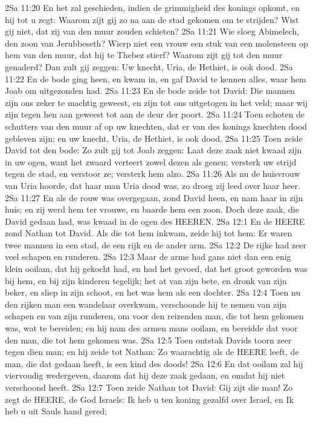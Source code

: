2Sa 11:20  En het zal geschieden, indien de grimmigheid des konings opkomt, en hij tot u zegt: Waarom zijt gij zo na aan de stad gekomen om te strijden? Wist gij niet, dat zij van den muur zouden schieten?
2Sa 11:21  Wie sloeg Abimelech, den zoon van Jerubbeseth? Wierp niet een vrouw een stuk van een molensteen op hem van den muur, dat hij te Thebez stierf? Waarom zijt gij tot den muur genaderd? Dan zult gij zeggen: Uw knecht, Uria, de Hethiet, is ook dood.
2Sa 11:22  En de bode ging heen, en kwam in, en gaf David te kennen alles, waar hem Joab om uitgezonden had.
2Sa 11:23  En de bode zeide tot David: Die mannen zijn ons zeker te machtig geweest, en zijn tot ons uitgetogen in het veld; maar wij zijn tegen hen aan geweest tot aan de deur der poort.
2Sa 11:24  Toen schoten de schutters van den muur af op uw knechten, dat er van des konings knechten dood gebleven zijn; en uw knecht, Uria, de Hethiet, is ook dood.
2Sa 11:25  Toen zeide David tot den bode: Zo zult gij tot Joab zeggen: Laat deze zaak niet kwaad zijn in uw ogen, want het zwaard verteert zowel dezen als genen; versterk uw strijd tegen de stad, en verstoor ze; versterk hem alzo.
2Sa 11:26  Als nu de huisvrouw van Uria hoorde, dat haar man Uria dood was, zo droeg zij leed over haar heer.
2Sa 11:27  En als de rouw was overgegaan, zond David heen, en nam haar in zijn huis; en zij werd hem ter vrouwe, en baarde hem een zoon. Doch deze zaak, die David gedaan had, was kwaad in de ogen des HEEREN.
2Sa 12:1  En de HEERE zond Nathan tot David. Als die tot hem inkwam, zeide hij tot hem: Er waren twee mannen in een stad, de een rijk en de ander arm.
2Sa 12:2  De rijke had zeer veel schapen en runderen.
2Sa 12:3  Maar de arme had gans niet dan een enig klein ooilam, dat hij gekocht had, en had het gevoed, dat het groot geworden was bij hem, en bij zijn kinderen tegelijk; het at van zijn bete, en dronk van zijn beker, en sliep in zijn schoot, en het was hem als een dochter.
2Sa 12:4  Toen nu den rijken man een wandelaar overkwam, verschoonde hij te nemen van zijn schapen en van zijn runderen, om voor den reizenden man, die tot hem gekomen was, wat te bereiden; en hij nam des armen mans ooilam, en bereidde dat voor den man, die tot hem gekomen was.
2Sa 12:5  Toen ontstak Davids toorn zeer tegen dien man; en hij zeide tot Nathan: Zo waarachtig als de HEERE leeft, de man, die dat gedaan heeft, is een kind des doods!
2Sa 12:6  En dat ooilam zal hij viervoudig wedergeven, daarom dat hij deze zaak gedaan, en omdat hij niet verschoond heeft.
2Sa 12:7  Toen zeide Nathan tot David: Gij zijt die man! Zo zegt de HEERE, de God Israels: Ik heb u ten koning gezalfd over Israel, en Ik heb u uit Sauls hand gered;
